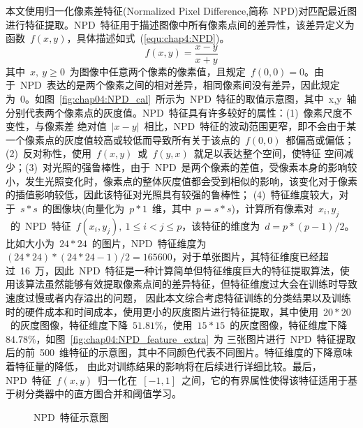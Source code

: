 本文使用归一化像素差特征(Normalized Pixel Difference,简称~NPD)对匹配最近图进行特征提取。NPD~特征用于描述图像中所有像素点间的差异性，该差异定义为函数~$f(x,y)$，具体描述如式~(\ref{equ:chap4:NPD})。
\begin{equation}
  \label{equ:chap4:NPD}
    f(x,y)=\frac{x-y}{x+y}
\end{equation}
其中~$x,~y\geq 0$~为图像中任意两个像素的像素值，且规定~$f(0,0)=0$。由于~NPD~表达的是两个像素之间的相对差异，相同像素间没有差异，因此规定为~0。如图~\ref{fig:chap04:NPD_cal}~所示为~NPD~特征的取值示意图，其中~x,y~轴
分别代表两个像素点的灰度值。NPD~特征具有许多较好的属性：(1)~像素尺度不变性，与像素差
绝对值~$|x-y|$~相比，NPD~特征的波动范围更窄，即不会由于某一个像素点的灰度值较高或较低而导致所有关于该点的~$f(0,0)$~都偏高或偏低；(2)~反对称性，使用~$f(x,y)$~或~$f(y,x)$~就足以表达整个空间，使特征
空间减少；(3)~对光照的强鲁棒性，由于~NPD~是两个像素的差值，受像素本身的影响较小，发生光照变化时，像素点的整体灰度值都会受到相似的影响，该变化对于像素的插值影响较低，因此该特征对光照具有较强的鲁棒性；
(4)~特征维度较大，对于~$s*s$~的图像块(向量化为~$p*1$~维，其中~$p=s*s$)，计算所有像素对~$x_i,y_j$~的~NPD~特征~$f(x_i,y_j),~1\leq i<j\leq p$，该特征的维度为~$d=p*(p-1)/2$。比如大小为~$24*24$~的图片，NPD~特征维度为
~$(24*24)*(24*24-1)/2=165600$，对于单张图片，其特征维度已经超过~16~万，因此~NPD~特征是一种计算简单但特征维度巨大的特征提取算法，使用该算法虽然能够有效提取像素点间的差异特征，但特征维度过大会在训练时导致速度过慢或者内存溢出的问题，
因此本文综合考虑特征训练的分类结果以及训练时的硬件成本和时间成本，使用更小的灰度图片进行特征提取，其中使用~$20*20$~的灰度图像，特征维度下降~$51.81\%$，使用~$15*15$~的灰度图像，特征维度下降~$84.78\%$，如图~\ref{fig:chap04:NPD_feature_extra}~为
三张图片进行~NPD~特征提取后的前~500~维特征的示意图，其中不同颜色代表不同图片。特征维度的下降意味着特征量的降低，
由此对训练结果的影响将在后续进行详细比较。最后，NPD~特征~$f(x,y)$~归一化在~$[-1,1]$~之间，它的有界属性使得该特征适用于基于树分类器中的直方图合并和阈值学习。

\begin{figure}[t] %
  \centering%
  \caption{NPD~特征示意图}
  \label{fig:chap04:NPD_feature}
\end{figure}

